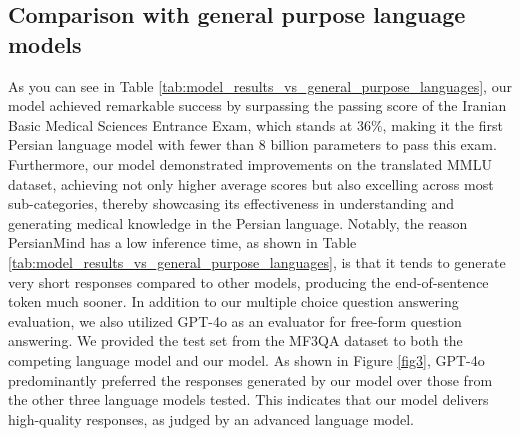 \documentclass[conference]{IEEEtran}
\begin{document}
	\subsection{Comparison with general purpose language models}
	As you can see in Table \ref{tab:model_results_vs_general_purpose_languages}, our model achieved remarkable success by surpassing the passing score of the Iranian Basic Medical Sciences Entrance Exam, which stands at 36\%, making it the first Persian language model with fewer than 8 billion parameters to pass this exam. Furthermore, our model demonstrated improvements on the translated MMLU dataset, achieving not only higher average scores but also excelling across most sub-categories, thereby showcasing its effectiveness in understanding and generating medical knowledge in the Persian language. Notably, the reason PersianMind has a low inference time, as shown in Table \ref{tab:model_results_vs_general_purpose_languages}, is that it tends to generate very short responses compared to other models, producing the end-of-sentence token much sooner. In addition to our multiple choice question answering evaluation, we also utilized GPT-4o \cite{b32} as an evaluator for free-form question answering. We provided the test set from the MF3QA dataset to both the competing language model and our model. As shown in Figure \ref{fig3}, GPT-4o predominantly preferred the responses generated by our model over those from the other three language models tested. This indicates that our model delivers high-quality responses, as judged by an advanced language model.
\end{document}
